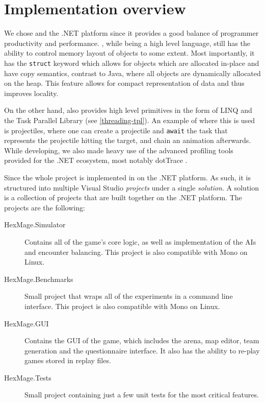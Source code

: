 \chapter{Implementation overview}
\label{implementation-overview}

We chose \Csh{} and the .NET platform since it provides a good balance of programmer productivity and performance. \Csh{}, while being a high level language, still has the ability to control memory layout of objects to some extent. Most importantly, it has the \verb|struct| keyword which allows for objects which are allocated in-place and have copy semantics, contrast to Java, where all objects are dynamically allocated on the heap. This feature allows for compact representation of data and thus improves locality.

On the other hand, \Csh{} also provides high level primitives in the form of LINQ and the Task Parallel Library \citep{tpl} (see \autoref{threading-tpl}). An example of where this is used is projectiles, where one can create a projectile and \verb|await| the task that represents the projectile hitting the target, and chain an animation afterwards. While developing, we also made heavy use of the advanced profiling tools provided for the .NET ecosystem, most notably dotTrace \citep{dot-trace}.

Since the whole project is implemented in \Csh{} on the .NET platform. As such, it is structured
into multiple Visual Studio \emph{projects} under a single \emph{solution}. A solution is a collection
of projects that are built together on the .NET platform. The projects are the following:

\begin{description}
	\item[HexMage.Simulator] Contains all of the game's core logic, as well as implementation of the AIs
		and encounter balancing. This project is also compatible with Mono on Linux.
	\item[HexMage.Benchmarks] Small project that wraps all of the experiments in a command line interface.
		This project is also compatible with Mono on Linux.
	\item[HexMage.GUI] Contains the GUI of the game, which includes the arena, map editor, team generation
		and the questionnaire interface. It also has the ability to re-play games stored in replay files.
	\item[HexMage.Tests] Small project containing just a few unit tests for the most critical features.
\end{description}

